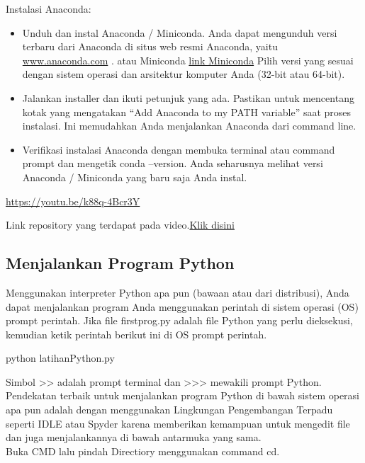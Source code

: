 \documentclass[
  letterpaper,
  DIV=11,
  numbers=noendperiod]{scrreprt}
\newenvironment{Shaded}{\begin{snugshade}}{\end{snugshade}}
\newcommand{\NormalTok}[1]{\textcolor[rgb]{0.00,0.23,0.31}{#1}}
\providecommand{\tightlist}{%
  \setlength{\itemsep}{0pt}\setlength{\parskip}{0pt}}\usepackage{longtable,booktabs,array}
\begin{document}
Instalasi Anaconda:

\begin{itemize}
\tightlist
\item
  Unduh dan instal Anaconda / Miniconda. Anda dapat mengunduh versi
  terbaru dari Anaconda di situs web resmi Anaconda, yaitu
  \href{https://www.anaconda.com/}{www.anaconda.com} . atau Miniconda
  \href{https://docs.conda.io/en/latest/miniconda.html}{link Miniconda}
  Pilih versi yang sesuai dengan sistem operasi dan arsitektur komputer
  Anda (32-bit atau 64-bit).
\item
  Jalankan installer dan ikuti petunjuk yang ada. Pastikan untuk
  mencentang kotak yang mengatakan ``Add Anaconda to my PATH variable''
  saat proses instalasi. Ini memudahkan Anda menjalankan Anaconda dari
  command line.
\item
  Verifikasi instalasi Anaconda dengan membuka terminal atau command
  prompt dan mengetik conda --version. Anda seharusnya melihat versi
  Anaconda / Miniconda yang baru saja Anda instal.
\end{itemize}

\url{https://youtu.be/k88q-4Bcr3Y}

Link repository yang terdapat pada
video.\href{https://github.com/yufaa/ComputerVision/blob/main/tensorflow-install-jul-2020.ipynb}{Klik
disini}

\hypertarget{menjalankan-program-python}{%
\subsection*{Menjalankan Program
Python}\label{menjalankan-program-python}}

Menggunakan interpreter Python apa pun (bawaan atau dari distribusi),
Anda dapat menjalankan program Anda menggunakan perintah di sistem
operasi (OS) prompt perintah. Jika file firstprog.py adalah file Python
yang perlu dieksekusi, kemudian ketik perintah berikut ini di OS prompt
perintah.

\begin{Shaded}
\begin{Highlighting}[]
\NormalTok{python latihanPython.py}
\end{Highlighting}
\end{Shaded}

Simbol \textgreater\textgreater{} adalah prompt terminal dan
\textgreater\textgreater\textgreater{} mewakili prompt Python.
Pendekatan terbaik untuk menjalankan program Python di bawah sistem
operasi apa pun adalah dengan menggunakan Lingkungan Pengembangan
Terpadu seperti IDLE atau Spyder karena memberikan kemampuan untuk
mengedit file dan juga menjalankannya di bawah antarmuka yang sama.\\
Buka CMD lalu pindah Directiory menggunakan command cd.
\end{document}
